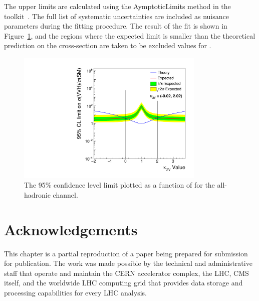 The upper limits are calculated using the AymptoticLimits method in the \COMBINE toolkit~\cite{CombinePaper}.
The full list of systematic uncertainties are included as nuisance parameters during the fitting procedure.
The result of the fit is shown in Figure~\ref{fig:vbsvvh_limit}, and the regions where the expected limit is smaller than the theoretical prediction on the cross-section are taken to be excluded values for \kVV.

\begin{figure}[htb]
    \centering
    \includegraphics[width=0.8\textwidth]{fig/vbsvvh/C2V_Limit.pdf}
    \caption{The 95\% confidence level limit plotted as a function of \kVV for the all-hadronic channel. 
    }
    \label{fig:vbsvvh_limit}
\end{figure}

\section{Acknowledgements}
This chapter is a partial reproduction of a paper being prepared for submission for publication. 
The work was made possible by the technical and administrative staff that operate and maintain the CERN accelerator complex, the LHC, CMS itself, and the worldwide LHC computing grid that provides data storage and processing capabilities for every LHC analysis. 
